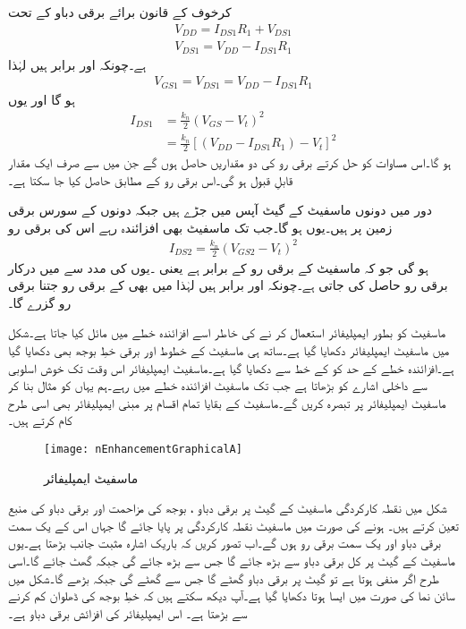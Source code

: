 کرخوف کے قانون برائے برقی دباو کے تحت
\begin{align*}
V_{DD}=I_{DS1}R_1+V_{DS1}\\
V_{DS1}=V_{DD}-I_{DS1}R_1
\end{align*}
ہے۔چونکہ  اور  برابر ہیں لہٰذا
\begin{align*}
V_{GS1}=V_{DS1}=V_{DD}-I_{DS1}R_1
\end{align*}
ہو گا اور یوں
\begin{align*}
I_{DS1}&=\frac{k_n}{2}\left(V_{GS}-V_t \right )^2 \\
&=\frac{k_n}{2} \left[\left(V_{DD}-I_{DS1} R_1 \right )-V_t \right ]^{2}
\end{align*}
ہو گا۔اس مساوات کو حل کرتے برقی رو کی دو مقداریں حاصل ہوں گے جن میں سے صرف ایک مقدار قابلِ قبول ہو گی۔اس برقی رو کے مطابق  حاصل کیا جا سکتا ہے۔

دور میں دونوں ماسفیٹ کے گیٹ آپس میں جڑے ہیں جبکہ دونوں کے سورس برقی زمین پر ہیں۔یوں  ہو گا۔جب تک ماسفیٹ  بھی افزائندہ رہے اس کی برقی رو
\begin{align*}
I_{DS2}=\frac{k_n}{2} \left(V_{GS2}-V_t \right )^2
\end{align*}
ہو گی جو کہ ماسفیٹ  کے برقی رو کے برابر ہے یعنی  ۔یوں   کی مدد سے   میں درکار برقی رو حاصل کی جاتی ہے۔چونکہ   اور  برابر ہیں لہٰذا  میں بھی  کے برقی رو جتنا برقی رو گزرے گا۔


ماسفیٹ کو بطور ایمپلیفائر استعمال کر نے کی خاطر اسے افزائندہ خطے میں مائل کیا جاتا ہے۔شکل  میں ماسفیٹ ایمپلیفائر دکھایا گیا ہے۔ساتھ ہی ماسفیٹ کے خطوط اور برقی خطِ بوجھ بھی دکھایا گیا ہے۔افزائندہ خطے کے حد کو  کے خط سے دکھایا گیا ہے۔ماسفیٹ ایمپلیفائر اس وقت تک خوش اسلوبی سے داخلی اشارے کو بڑھاتا ہے جب تک ماسفیٹ افزائندہ خطے میں رہے۔ہم یہاں  کو مثال بنا کر ماسفیٹ ایمپلیفائر پر تبصرہ کریں گے۔ماسفیٹ کے بقایا تمام اقسام پر مبنی ایمپلیفائر بھی اسی طرح کام کرتے ہیں۔
\begin{figure}
\centering
\texttt{[image: nEnhancementGraphicalA]}
\caption{ماسفیٹ ایمپلیفائر}
\label{شکل_ماسفیٹ_ایمپلیفائر_ترسیمی_تجزیہ}
\end{figure}

شکل  میں نقطہ کارکردگی ماسفیٹ کے گیٹ پر برقی دباو ، بوجھ کی مزاحمت  اور برقی دباو کی منبع  تعین کرتے ہیں۔ ہونے کی صورت میں ماسفیٹ نقطہ کارکردگی پر پایا جائے گا جہاں اس کے یک سمت برقی دباو  اور یک سمت برقی رو  ہوں گے۔اب تصور کریں کہ باریک اشارہ  مثبت جانب بڑھتا ہے۔یوں ماسفیٹ کے گیٹ پر کل برقی دباو  سے بڑھ جائے گا جس سے   بڑھ جائے گی جبکہ  گھٹ جائے گا۔اسی طرح اگر  منفی ہوتا ہے تو گیٹ پر برقی دباو گھٹے گا جس سے  گھٹے گی جبکہ  بڑھے گا۔شکل میں سائن نما  کی صورت میں ایسا ہوتا دکھایا گیا ہے۔آپ دیکھ سکتے ہیں کہ خطِ بوجھ کی ڈھلوان کم کرنے سے  بڑھتا ہے۔ اس ایمپلیفائر کی افزائش برقی دباو  ہے۔

